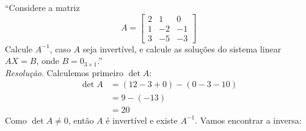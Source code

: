 \enquote{Considere a matriz 
\begin{displaymath}
    A = \left[\begin{array}{ccc}
         2 & 1 & 0  \\
         1 & -2 & -1 \\
         3 & -5 & -3
    \end{array}\right]
\end{displaymath}
Calcule $A^{-1}$, caso $A$ seja invertível, e calcule as soluções do sistema linear $AX = B$, onde $B = 0_{3\times1}$.}
\\ 
\emph{Resolução}. Calculemos primeiro $\det A$:
\begin{align*}
    \det A &= (12 - 3 + 0) - (0 - 3 - 10) \\ &= 
    9 - (-13) \\ &=
    20
\end{align*}
Como $\det A \ne 0$, então $A$ é invertível e existe $A^{-1}$. Vamos encontrar a inversa:
